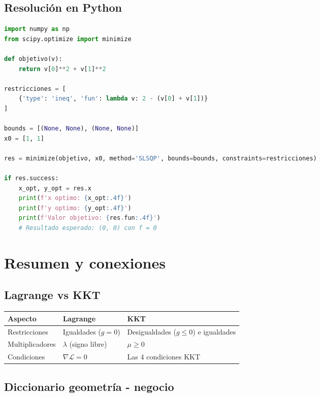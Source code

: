 \documentclass[12pt]{article}
\begin{document}
\subsection{Resolución en Python}

\begin{lstlisting}[language=Python]
import numpy as np
from scipy.optimize import minimize

def objetivo(v):
    return v[0]**2 + v[1]**2

restricciones = [
    {'type': 'ineq', 'fun': lambda v: 2 - (v[0] + v[1])}
]

bounds = [(None, None), (None, None)]
x0 = [1, 1]

res = minimize(objetivo, x0, method='SLSQP', bounds=bounds, constraints=restricciones)

if res.success:
    x_opt, y_opt = res.x
    print(f'x optimo: {x_opt:.4f}')
    print(f'y optimo: {y_opt:.4f}')
    print(f'Valor objetivo: {res.fun:.4f}')
    # Resultado esperado: (0, 0) con f = 0
\end{lstlisting}

\section{Resumen y conexiones}

\subsection{Lagrange vs KKT}

\begin{center}
\begin{tabular}{@{}lll@{}}
\toprule
\textbf{Aspecto} & \textbf{Lagrange} & \textbf{KKT} \\
\midrule
Restricciones & Igualdades ($g = 0$) & Desigualdades ($g \leq 0$) e igualdades \\
Multiplicadores & $\lambda$ (signo libre) & $\mu \geq 0$ \\
Condiciones & $\nabla \mathcal{L} = 0$ & Las 4 condiciones KKT \\
\bottomrule
\end{tabular}
\end{center}

\subsection{Diccionario geometría - negocio}
\end{document}
